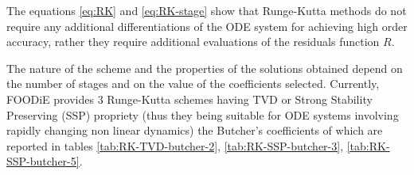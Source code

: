 \documentclass[pdftex,preprint,3p,times,numbers]{elsarticle}
\begin{document}
\begin{table}[!ht]
\caption{Butcher's table for explicit Runge-Kutta schemes}\label{tab:butcher-table}
\centering
{}
\end{table}

The equations \ref{eq:RK} and \ref{eq:RK-stage} show that Runge-Kutta methods do not require any additional differentiations of the ODE system for achieving high order accuracy, rather they require additional evaluations of the residuals function $R$.

The nature of the scheme and the properties of the solutions obtained depend on the number of stages and on the value of the coefficients selected. Currently, FOODiE provides 3 Runge-Kutta schemes having TVD or Strong Stability Preserving (SSP) propriety (thus they being suitable for ODE systems involving rapidly changing non linear dynamics) the Butcher's coefficients of which are reported in tables \ref{tab:RK-TVD-butcher-2}, \ref{tab:RK-SSP-butcher-3}, \ref{tab:RK-SSP-butcher-5}.

\begin{table}[!ht]
  \centering
  \caption{Butcher's table of 2 stages, $2^{nd}$ order, Runge-Kutta TVD scheme\label{tab:RK-TVD-butcher-2}}
\end{table}

\begin{table}[!ht]
  \centering
  \caption{Butcher's table of 3 stages, $3^{rd}$ order, Runge-Kutta SSP scheme\label{tab:RK-SSP-butcher-3}}
\end{table}
\end{document}

